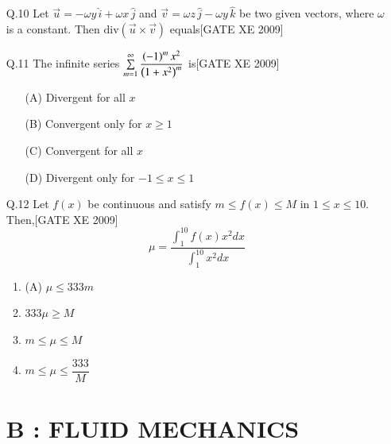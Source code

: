 \documentclass[journal,12pt,onecolumn]{IEEEtran}
\theoremstyle{remark}
\begin{document}
\begin{enumerate}
\item[Q.10] Let $\vec{u} = -\omega y\, \hat{i} + \omega x\, \hat{j}$ and $\vec{v} = \omega z\, \hat{j} - \omega y\, \hat{k}$ be two given vectors, where $\omega$ is a constant. Then $\mathrm{div} (\vec{u} \times \vec{v})$ equals\hfill[GATE XE 2009]\\
 \begin{enumerate}
\end{enumerate}
\item[Q.11] The infinite series $\sum\limits_{m=1}^\infty \dfrac{\left(-1\right)^m x^2}{\left(1 + x^2\right)^m}$ is\hfill[GATE XE 2009]
    \begin{enumerate}
        \item[(A)] Divergent for all $x$
        \item[(B)] Convergent only for $x \geq 1$
        \item[(C)] Convergent for all $x$
        \item[(D)] Divergent only for $-1 \leq x \leq 1$
    \end{enumerate}

\item[Q.12] Let $f(x)$ be continuous and satisfy $m \leq f(x) \leq M$ in $1 \leq x \leq 10$. Then,\hfill[GATE XE 2009]
$$
\mu = \frac{\int_1^{10} f(x) x^2 dx}{\int_1^{10} x^2 dx}
$$
\begin{multicols}{4}
\begin{enumerate}
 
 
      \item  (A) $\mu \leq 333 m$
       \item  $333 \mu \geq M$
       \item $m \leq \mu \leq M$
       \item  $m \leq \mu \leq \dfrac{333}{M}$
        
     \end{enumerate}
  \end{multicols}

   


\section*{B : FLUID MECHANICS}







\end{enumerate}
\end{document}
